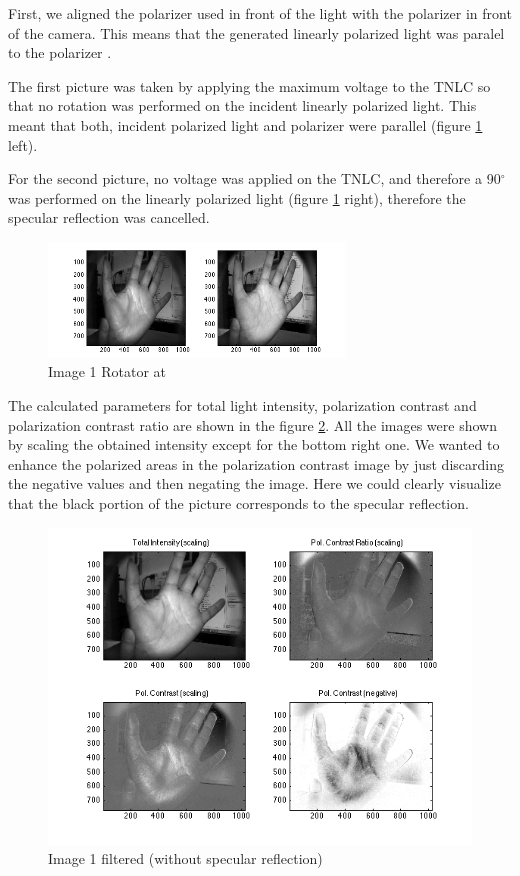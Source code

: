 \documentclass{article}
\begin{document}
First, we aligned the polarizer used in front of the light with the polarizer in front
of the camera. This means that the generated linearly polarized light was paralel to the 
polarizer . 

The first picture was taken by applying the maximum voltage to the
TNLC so that no rotation was performed on the incident linearly polarized light. This meant that 
both, incident polarized light and polarizer were parallel (figure \ref{fig:cpm3-1} left).

For the second picture, no voltage was applied on the TNLC, and therefore a 90$^\circ$
was performed on the linearly polarized light (figure \ref{fig:cpm3-1} right), therefore
the specular reflection was cancelled.


\begin{figure}[H]
\centering
\includegraphics[width=0.7\textwidth,natwidth=100,natheight=100]{../CPM/Difuse/difnodif.png}
  \caption{Image 1 Rotator at }
  \label{fig:cpm3-1}
\end{figure}
The calculated parameters for total light intensity, polarization contrast and polarization
contrast ratio are shown in the figure \ref{fig:cpm3-2}. All the images were shown by
scaling the obtained intensity except for the bottom right one. We wanted to enhance the 
polarized areas in the polarization contrast image by just discarding the negative values and 
then negating the image. Here we could clearly visualize that the black 
portion of the picture corresponds 
to the specular reflection.
\begin{figure}[H]
\includegraphics[width=1.0\textwidth,natwidth=100,natheight=100]{../CPM/Difuse/difparams.png}
  \caption{Image 1 filtered (without specular reflection)}
  \label{fig:cpm3-2}
\end{figure}



\end{document}
